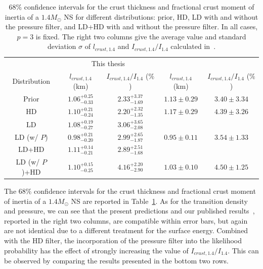\begin{table}[!t]
\begin{center}
\begin{tabular}{ccccc} 
  \toprule
  \toprule
  & \multicolumn{2}{c}{This thesis} & 
  \multicolumn{2}{c}{\cite{Carreau2019moi}}\\
  Distribution & $l_{crust,1.4}$ (km) & $I_{crust,1.4}/I_{1.4}$ ($\%$) &
  $l_{crust,1.4}$ (km) & $I_{crust,1.4}/I_{1.4}$ ($\%$)\\
  \midrule
  Prior & $1.06_{-0.33}^{+0.25}$ & $2.33_{-1.69}^{+3.37}$ & $1.13\pm 0.29$ &
  $3.40\pm 3.34$\\
  HD & $1.10_{-0.24}^{+0.21}$ & $2.20_{-1.35}^{+2.32}$ & $1.17\pm 0.29$ &
  $4.39\pm 3.26$\\ 
  LD & $1.08_{-0.27}^{+0.19}$ & $3.06_{-2.08}^{+3.65}$ & &\\ 
  LD (w/ $P$) & $0.98_{-0.20}^{+0.21}$ & $2.99_{-1.87}^{+2.65}$ & 
  $0.95\pm 0.11$ & $3.54\pm 1.33$\\ 
  LD+HD & $1.11_{-0.21}^{+0.14}$ & $2.89_{-1.68}^{+2.51}$ & &\\ 
  LD (w/ $P$)+HD & $1.10_{-0.25}^{+0.15}$ & $4.16_{-2.90}^{+2.20}$ & $1.03\pm
  0.10$ & $4.50\pm 1.25$\\ 
  \bottomrule
  \bottomrule
\end{tabular}
\end{center}
\caption[{$68\%$ confidence intervals for the crust thickness and
fractional crust moment of inertia of $1.4M_\odot$ neutron star for different 
filters}]{{$68\%$ confidence intervals for the crust thickness and 
  fractional crust moment of inertia of a $1.4M_\odot$ NS for different 
  distributions: prior, HD, LD with and without the pressure filter, and LD+HD 
  with and without the pressure filter. In all cases, $p=3$ is fixed. The right 
  two columns give the average value and standard deviation $\sigma$ of
  $l_{crust,1.4}$ and $I_{crust,1.4}/I_{1.4}$ calculated 
  in~\cite{Carreau2019moi}.}}\label{table:crustobs}
\end{table}
%
{
The $68\%$ confidence intervals for the crust thickness and fractional crust 
moment of inertia of a $1.4M_\odot$ NS are reported in 
Table~\ref{table:crustobs}. As for the transition density and pressure, we can 
see that the present predictions and our published 
results~\cite{Carreau2019moi}, reported in the right two columns, are 
compatible within error bars, but again are not identical due to a different 
treatment for the surface energy. 
Combined with the HD filter, the incorporation of the pressure filter into the 
likelihood probability has the effect of strongly increasing the value of 
$I_{crust,1.4}/I_{1.4}$. This can be observed by comparing the results 
presented in the bottom two rows.}

